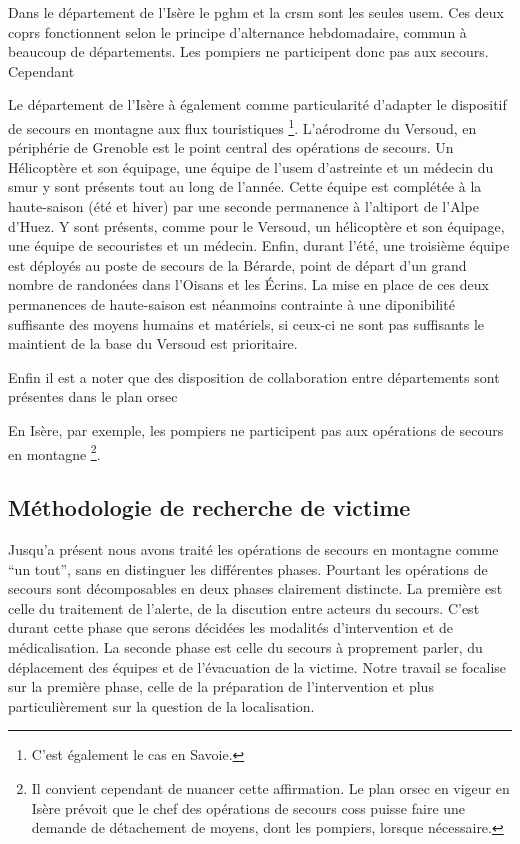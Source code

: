Dans le département de l'Isère le \ac{pghm} et la \ac{crsm} sont les
seules \ac{usem}. Ces deux coprs fonctionnent selon le principe
d'alternance hebdomadaire, commun à beaucoup de départements. Les
pompiers ne participent donc pas aux secours. Cependant 

Le département de l'Isère à également comme particularité d'adapter le
dispositif de secours en montagne aux flux touristiques
\footnote{C'est également le cas en Savoie.}. L'aérodrome du Versoud,
en périphérie de Grenoble est le point central des opérations de
secours. Un Hélicoptère et son équipage, une équipe de l'\ac{usem}
d'astreinte et un médecin du \ac{smur} y sont présents tout au long de
l'année. Cette équipe est complétée à la haute-saison (été et hiver)
par une seconde permanence à l'altiport de l'Alpe d'Huez. Y sont
présents, comme pour le Versoud, un hélicoptère et son équipage, une
équipe de secouristes et un médecin. Enfin, durant l'été, une
troisième équipe est déployés au poste de secours de la Bérarde, point
de départ d'un grand nombre de randonées dans l'Oisans et les
Écrins. La mise en place de ces deux permanences de haute-saison est
néanmoins contrainte à une diponibilité suffisante des moyens humains
et matériels, si ceux-ci ne sont pas suffisants le maintient de la
base du Versoud est prioritaire.


Enfin il est a noter que des disposition de collaboration entre
départements sont présentes dans le plan \ac{orsec}

En Isère, par exemple, les pompiers ne participent pas aux opérations
de secours en montagne \footnote{Il convient cependant de nuancer
  cette affirmation. Le plan \ac{orsec} en vigeur en Isère prévoit que
  le chef des opérations de secours \acp{cos} puisse faire une demande
  de détachement de moyens, dont les pompiers, lorsque nécessaire.}.

\subsection{Méthodologie de recherche de victime}
\label{susec:1-1-2}

Jusqu'a présent nous avons traité les opérations de secours en
montagne comme \enquote{un tout}, sans en distinguer les différentes
phases. Pourtant les opérations de secours sont décomposables en deux
phases clairement distincte. La première est celle du traitement de
l'alerte, de la discution entre acteurs du secours. C'est durant cette
phase que serons décidées les modalités d'intervention et de
médicalisation. La seconde phase est celle du secours à proprement
parler, du déplacement des équipes et de l'évacuation de la
victime. Notre travail se focalise sur la première phase, celle de la
préparation de l'intervention et plus particulièrement sur la question
de la localisation.


